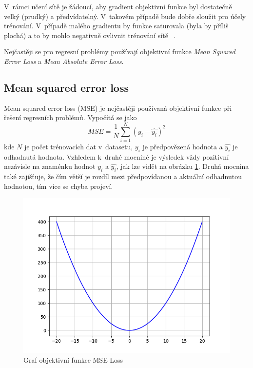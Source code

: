 V~rámci učení sítě je žádoucí, aby gradient objektivní funkce byl dostatečně velký (prudký) a předvídatelný. V~takovém případě bude dobře sloužit pro účely trénování. V~případě malého gradientu by funkce saturovala (byla by příliš plochá) a to by mohlo negativně ovlivnit trénování sítě~ \cite{mitdeeplearning}. 

Nejčastěji se pro regresní problémy používají objektivní funkce \textit{Mean Squared Error Loss} a \textit{Mean Absolute Error Loss}.


\subsection*{Mean squared error loss}
Mean squared error loss (MSE) je nejčastěji používaná objektivní funkce při řešení regresních problémů. Vypočítá se jako
\begin{equation}
  MSE = \frac{1}{N}\sum_{i=1}^N(y_i - \hat{y_i})^2
\end{equation}
kde $N$ je počet trénovacích dat v~datasetu, $y_i$ je předpovězená hodnota a $\hat{y_i}$ je odhadnutá hodnota. Vzhledem k~druhé mocnině je výsledek vždy pozitivní nezávisle na znaménku hodnot $y_i$ a $\hat{y_i}$, jak lze vidět na obrázku \ref{fig:mseloss}. Druhá mocnina také zajišťuje, že čím větší je rozdíl mezi předpovídanou a aktuální odhadnutou hodnotou, tím více se chyba projeví. 

\begin{figure}[H]
    \centering
    \includegraphics[scale=0.4]{obrazky-figures/mseloss.png}
    \caption{\label{fig:mseloss}Graf objektivní funkce MSE Loss}
\end{figure}


